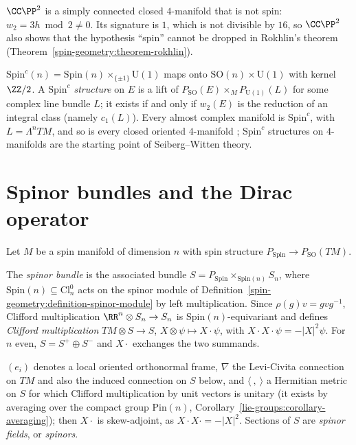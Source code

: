 \begin{counterexample}\label{spin-geometry:counterexample-cp2}
$\CC\PP^2$ is a simply connected closed $4$-manifold that is not spin: $w_2 = 3h \bmod 2 \neq 0$. Its signature is $1$, which is not divisible by $16$, so $\CC\PP^2$ also shows that the hypothesis ``spin'' cannot be dropped
in Rokhlin's theorem (Theorem~\ref{spin-geometry:theorem-rokhlin}).
\end{counterexample}

\begin{remark}\label{spin-geometry:remark-spin-c}
$\mathrm{Spin}^c(n) = \mathrm{Spin}(n) \times_{\{\pm 1\}} \mathrm{U}(1)$ maps onto $\mathrm{SO}(n) \times \mathrm{U}(1)$ with kernel $\ZZ/2$. A \emph{$\mathrm{Spin}^c$ structure} on $E$ is a lift of $P_{\mathrm{SO}}(E) \times_M P_{\mathrm{U}(1)}(L)$ for some
complex line bundle $L$; it exists if and only if $w_2(E)$ is the reduction of an integral class (namely $c_1(L)$). Every almost complex manifold is $\mathrm{Spin}^c$, with $L = \Lambda^nTM$, and so is every closed oriented
$4$-manifold \cite[Appendix D]{lawson-michelsohn}; $\mathrm{Spin}^c$ structures on $4$-manifolds are the starting point of Seiberg--Witten theory.
\end{remark}

\section{Spinor bundles and the Dirac operator}\label{spin-geometry:section-dirac-operator}

Let $M$ be a spin manifold of dimension $n$ with spin structure $P_{\mathrm{Spin}} \to P_{\mathrm{SO}}(TM)$.

\begin{definition}\label{spin-geometry:definition-spinor-bundle}
The \emph{spinor bundle} is the associated bundle $S = P_{\mathrm{Spin}} \times_{\mathrm{Spin}(n)} S_n$, where $\mathrm{Spin}(n) \subseteq \mathrm{Cl}_n^0$ acts on the spinor module of
Definition~\ref{spin-geometry:definition-spinor-module} by left multiplication. Since $\rho(g)v = gvg^{-1}$, Clifford multiplication $\RR^n \otimes S_n \to S_n$ is $\mathrm{Spin}(n)$-equivariant and defines \emph{Clifford
multiplication} $TM \otimes S \to S$, $X \otimes \psi \mapsto X \cdot \psi$, with $X \cdot X \cdot \psi = -|X|^2\psi$. For $n$ even, $S = S^+ \oplus S^-$ and $X \cdot$ exchanges the two summands.
\end{definition}

\begin{notation}\label{spin-geometry:notation-dirac}
$(e_i)$ denotes a local oriented orthonormal frame, $\nabla$ the Levi-Civita connection on $TM$ and also the induced connection on $S$ below, and $\langle\ ,\ \rangle$ a Hermitian metric on $S$ for which
Clifford multiplication by unit vectors is unitary (it exists by averaging over the compact group $\mathrm{Pin}(n)$, Corollary~\ref{lie-groups:corollary-averaging}); then $X \cdot$ is skew-adjoint, as
$X \cdot X \cdot = -|X|^2$. Sections of $S$ are \emph{spinor fields}, or \emph{spinors}.
\end{notation}

